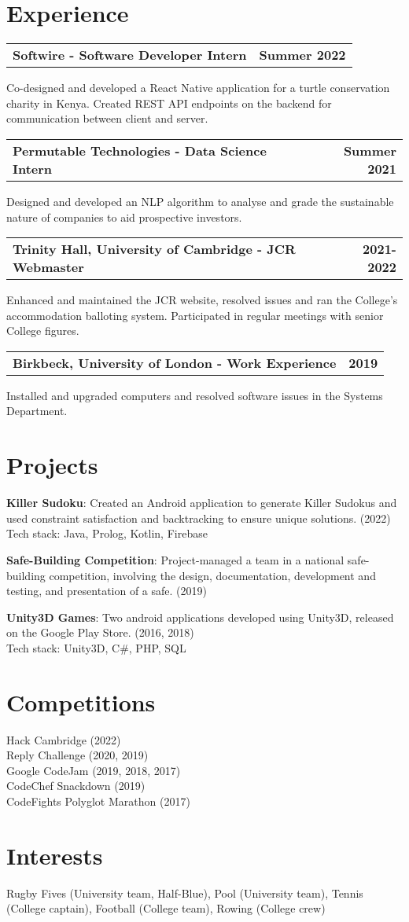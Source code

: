 \documentclass[a4paper,20pt]{article}
\makeatletter
\newcommand{\resumeItem}[2]{
  {
    \textbf{#1}{: #2 \\ \vspace{2pt}}
  }
}
\newcommand{\resumeSubheadingSingleLine}[2]{
  \vspace{2pt}
    \begin{tabular*}{0.97\textwidth}{l@{\extracolsep{\fill}}r}
      \textbf{#1} & \textbf{#2} \\
    \end{tabular*}
}
\makeatother
\begin{document}
\section{\textbf{Experience}}
    \resumeSubheadingSingleLine{Softwire - Software Developer Intern}{Summer 2022}
    {Co-designed and developed a React Native application for a turtle conservation charity in Kenya. Created REST API endpoints on the backend for communication between client and server.}
    \vspace{2pt}
    \resumeSubheadingSingleLine{Permutable Technologies - Data Science Intern}{Summer 2021}
    { Designed and developed an NLP algorithm to analyse and grade the sustainable nature of companies to aid prospective investors.}
    \vspace{2pt}
    \resumeSubheadingSingleLine{Trinity Hall, University of Cambridge - JCR Webmaster}{2021-2022}
    { Enhanced and maintained the JCR website, resolved issues and ran the College's accommodation balloting system. Participated in regular meetings with senior College figures.}
    \vspace{2pt}
    \resumeSubheadingSingleLine{Birkbeck, University of London - Work Experience}{2019}
    { Installed and upgraded computers and resolved software issues in the Systems Department.}

\vspace{5pt}
\section{\textbf{Projects}}
\vspace{2pt}
\resumeItem{Killer Sudoku}
{Created an Android application to generate Killer Sudokus and used constraint satisfaction and backtracking to ensure unique solutions. (2022) \\ Tech stack: Java, Prolog, Kotlin, Firebase}
\vspace{2pt}
\resumeItem{Safe-Building Competition}{Project-managed a team in a national safe-building competition, involving the design, documentation, development and testing, and presentation of a safe. (2019)}
\vspace{2pt}
\resumeItem{Unity3D Games}{Two android applications developed using Unity3D, released on the Google Play Store. (2016, 2018) \\ Tech stack: Unity3D, C\#, PHP, SQL}

\vspace{5pt}
\section{\textbf{Competitions}}
     Hack Cambridge (2022) \\
     Reply Challenge (2020, 2019) \\
     Google CodeJam (2019, 2018, 2017) \\
     CodeChef Snackdown (2019) \\
     CodeFights Polyglot Marathon (2017) \\
\section{\textbf{Interests}}
 Rugby Fives (University team, Half-Blue), Pool (University team), Tennis (College captain), Football (College team), Rowing (College crew)
\end{document}
